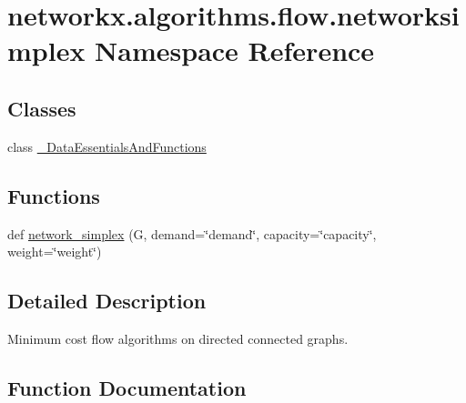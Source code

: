 \hypertarget{namespacenetworkx_1_1algorithms_1_1flow_1_1networksimplex}{}\section{networkx.\+algorithms.\+flow.\+networksimplex Namespace Reference}
\label{namespacenetworkx_1_1algorithms_1_1flow_1_1networksimplex}
\subsection*{Classes}
\begin{DoxyCompactItemize}
\item 
class \hyperlink{classnetworkx_1_1algorithms_1_1flow_1_1networksimplex_1_1__DataEssentialsAndFunctions}{\+\_\+\+Data\+Essentials\+And\+Functions}
\end{DoxyCompactItemize}
\subsection*{Functions}
\begin{DoxyCompactItemize}
\item 
def \hyperlink{namespacenetworkx_1_1algorithms_1_1flow_1_1networksimplex_ad3418489cacc4ef8c7739526269ea1f9}{network\+\_\+simplex} (G, demand=\char`\"{}demand\char`\"{}, capacity=\char`\"{}capacity\char`\"{}, weight=\char`\"{}weight\char`\"{})
\end{DoxyCompactItemize}


\subsection{Detailed Description}
\begin{DoxyVerb}Minimum cost flow algorithms on directed connected graphs.
\end{DoxyVerb}
 

\subsection{Function Documentation}
\mbox{\label{namespacenetworkx_1_1algorithms_1_1flow_1_1networksimplex_ad3418489cacc4ef8c7739526269ea1f9}} 
